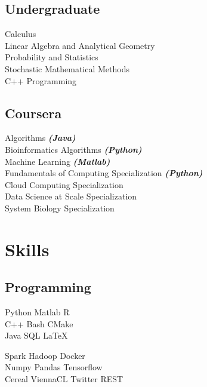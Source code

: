 \documentclass[]{deedy-resume-openfont}
\begin{document}
\begin{minipage}[t]{0.33\textwidth}
\subsection{Undergraduate}
Calculus \\
Linear Algebra and Analytical Geometry \\
Probability and Statistics \\
Stochastic Mathematical Methods \\
C++ Programming \\
\sectionsep

\subsection{Coursera}
Algorithms {\footnotesize \textit{\textbf{(Java)}}} \\
Bioinformatics Algorithms {\footnotesize \textit{\textbf{(Python)}}} \\
Machine Learning {\footnotesize \textit{\textbf{(Matlab)}}} \\
Fundamentals of Computing Specialization {\footnotesize \textit{\textbf{(Python)}}} \\
Cloud Computing Specialization \\
Data Science at Scale Specialization \\
System Biology Specialization \\
\sectionsep


\section{Skills}
\subsection{Programming}
Python \textbullet{} Matlab \textbullet{} R \\
C++ \textbullet{} Bash \textbullet{} CMake \\
Java \textbullet{} SQL \textbullet{} \LaTeX \\
\sectionsep


Spark \textbullet{} Hadoop \textbullet{} Docker\\
Numpy \textbullet{} Pandas \textbullet{} Tensorflow \\
Cereal \textbullet{} ViennaCL \textbullet{} Twitter REST 
\sectionsep

%
%

\end{minipage} 
\end{document}
